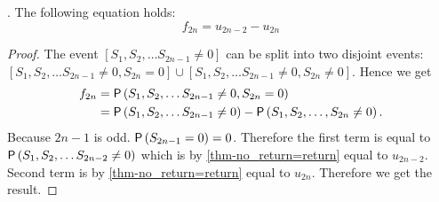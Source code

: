 \begin{thm}\label{thm-f_2n}
  \Lrws. The following equation holds:
 \[
 f_{2n}=u_{2n-2}-u_{2n}
 \]
\end{thm}
\begin{proof}
 The event $[S_1, S_2, \ldots S_{2n-1}\neq 0]$ can be split into two disjoint events:
 $[S_1, S_2, \ldots S_{2n-1}\neq 0, S_{2n}=0] \cup [S_1, S_2, \ldots S_{2n-1}\neq 0, S_{2n}\neq 0]$.
 Hence we get
\[
  \begin{split}
    f_{2n} & =\operatorname{\mathsf{P}} \left( S_1, S_2, \ldots S_{2n-1}\neq 0, S_{2n}=0 \right)\\
    & =\operatorname{\mathsf{P}} \left( S_1, S_2, \ldots S_{2n-1}\neq 0 \right) -\operatorname{\mathsf{P}} \left( S_1, S_2, \ldots, S_{2n}\neq 0 \right).
  \end{split}
 \]
 Because $2n-1$ is odd. $\operatorname{\mathsf{P}} \left( S_{2n-1}=0 \right) =0$.
 Therefore the first term is equal to $\operatorname{\mathsf{P}} \left( S_1, S_2, \ldots S_{2n-2}\neq 0 \right)$
 which is by \ref{thm-no_return=return} equal to $u_{2n-2}$. Second term is by \ref{thm-no_return=return} equal to $u_{2n}$. Therefore we get the result.
\end{proof}
